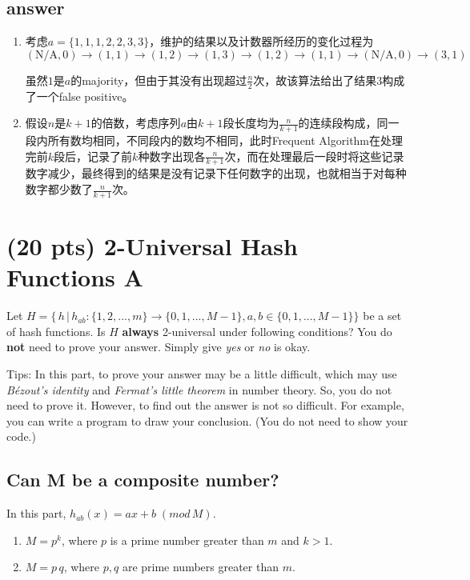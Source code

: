 \documentclass[12pt]{article}
\begin{document}
\subsection*{answer}
\begin{enumerate}
	\item 考虑$a = \{1, 1, 1, 2, 2, 3, 3\}$，维护的结果以及计数器所经历的变化过程为
	$$(\text{N/A}, 0) \to (1, 1) \to (1, 2) \to (1, 3) \to (1, 2) \to (1, 1) \to (\text{N/A}, 0) \to (3, 1)$$
	
	虽然$1$是$a$的majority，但由于其没有出现超过$\frac n2$次，故该算法给出了结果$3$构成了一个false positive。
	\item 假设$n$是$k+1$的倍数，考虑序列$a$由$k+1$段长度均为$\frac{n}{k+1}$的连续段构成，同一段内所有数均相同，不同段内的数均不相同，此时Frequent Algorithm在处理完前$k$段后，记录了前$k$种数字出现各$\frac{n}{k+1}$次，而在处理最后一段时将这些记录数字减少，最终得到的结果是没有记录下任何数字的出现，也就相当于对每种数字都少数了$\frac{n}{k+1}$次。
\end{enumerate}
\section{(20 pts) 2-Universal Hash Functions A}
Let $H = \{ \, h \, | \, h_{ab}:\{1, 2, ..., m\} \rightarrow \{0, 1, ..., M-1\}, a, b \in \{0, 1, ..., M-1 \} \}$ be a set of hash functions. Is $H$ {\bf always} 2-universal under following conditions? You do {\bf not} need to prove your answer. Simply give \emph{yes} or \emph{no} is okay.

Tips: In this part, to prove your answer may be a little difficult, which may use \emph{Bézout's identity} and \emph{Fermat's little theorem} in number theory. So, you do not need to prove it. However, to find out the answer is not so difficult. For example, you can write a program to draw your conclusion. (You do not need to show your code.)

\subsection{Can M be a composite number?}
In this part, $h_{ab}(x) = ax + b \; (mod \, M)$.
\begin{enumerate}
    \item 
    $M = p ^ k$, where $p$ is a prime number greater than $m$ and $k > 1$.
    \item
    $M = p \, q$, where $p, q$ are prime numbers greater than $m$.
\end{enumerate}
\end{document}
